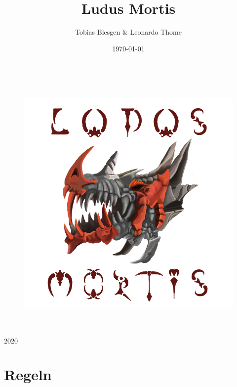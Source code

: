 \documentclass[letterpaper,twocolumn,openany,nodeprecatedcode]{scrbook}
\title{Ludus Mortis}
\author{Tobias Blesgen & Leonardo Thome}
\date{\today}
\begin{document}
\begin{titlepage}
		\\
		
		\vspace{10mm}
		\begin{figure}[h]
            \centering
            \includegraphics[width = 15cm]{Pictures/logo2.png}
             \label{fig:meine-grafik}
        \end{figure}
        
		\vspace{10mm}
		\\
		\vspace{15mm}
		\\

		\vspace{\fill}
		\centering \large{2020}
\end{titlepage}
\newpage
\tableofcontents
\thispagestyle{headings} 

\clearpage

\part{Regeln}
\end{document}
